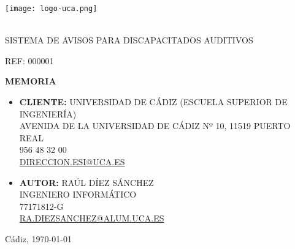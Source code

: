 \thispagestyle{empty}
\normalsize
\mdseries
\begin{center}

  \texttt{[image: logo-uca.png]} \\\

  \vspace{1.5cm}

  \huge{SISTEMA DE AVISOS PARA DISCAPACITADOS AUDITIVOS} \\
  
  \vspace{0.6cm}

  \large{REF: 000001} \\
  
  \vspace{1.0cm}

  \Huge{\textbf{MEMORIA}} \\

  \vspace{2.5cm}
  

\end{center}
\begin{itemize}
\item {\textbf{CLIENTE:} UNIVERSIDAD DE CÁDIZ (ESCUELA SUPERIOR DE INGENIERÍA)\\
            AVENIDA DE LA UNIVERSIDAD DE CÁDIZ Nº 10, 11519 PUERTO REAL\\
            956 48 32 00\\
            \underline{DIRECCION.ESI@UCA.ES}
            }
            \vspace{0.5cm}
\item {\textbf{AUTOR:} RAÚL DÍEZ SÁNCHEZ\\
            INGENIERO INFORMÁTICO\\
            77171812-G\\
            \underline{RA.DIEZSANCHEZ@ALUM.UCA.ES}}
\end{itemize}

\vspace{0.2cm}

\begin{flushright}
  \large{Cádiz, \today} \\
\end{flushright}

